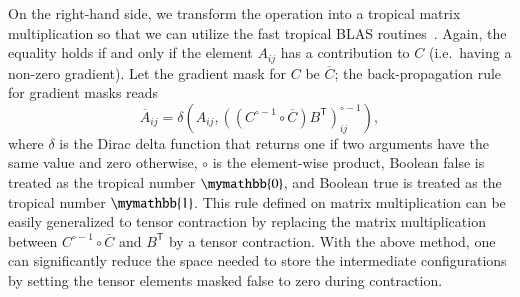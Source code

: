 \documentclass[review, onefignum, onetabnum]{siamart190516}
\begin{document}
On the right-hand side, we transform the operation into a tropical matrix multiplication so that we can utilize the fast tropical BLAS routines~\cite{TropicalGEMM}.
Again, the equality holds if and only if the element $A_{ij}$ has a contribution to $C$ (i.e.\ having a non-zero gradient).
Let the gradient mask for $C$ be $\overline C$; the back-propagation rule for gradient masks reads
\begin{equation}\label{eq:adrule}
\overline{A}_{ij} = \delta \left(A_{ij}, \left( \left( C^{\circ-1} \circ \overline C \right) B^{\mathsf{T}} \right)_{ij}^{\circ -1} \right),
\end{equation}
where $\delta$ is the Dirac delta function that returns one if two arguments have the same value and zero otherwise, $\circ$ is the element-wise product, Boolean false is treated as the tropical number $\mymathbb{0}$, and Boolean true is treated as the tropical number $\mymathbb{1}$.
This rule defined on matrix multiplication can be easily generalized to tensor contraction by replacing the matrix multiplication between $C^{\circ-1} \circ \overline C$ and $B^{\mathsf{T}}$ by a tensor contraction.
With the above method, one can significantly reduce the space needed to store the intermediate configurations by setting the tensor elements masked false to zero during contraction.
\end{document}

